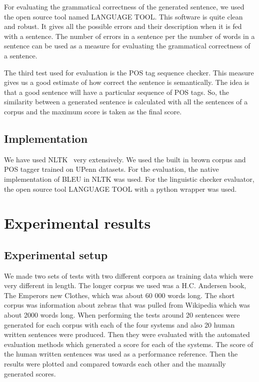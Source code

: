 \documentclass[a4paper,12pt]{article}
\begin{document}
For evaluating the grammatical correctness of the generated sentence, we used the
open source tool named LANGUAGE TOOL. This software is quite clean and robust. It gives 
all the possible errors and their description when it is fed with a sentence. The number 
of errors in a sentence per the number of words in a sentence can be used as a measure
for evaluating the grammatical correctness of a sentence.

The third test used for evaluation is the POS tag sequence checker. This measure 
gives us a good estimate of how correct the sentence is semantically. The idea
is that a good sentence will have a particular sequence of POS tags. So, the similarity
between a generated sentence is calculated with all the sentences of a corpus and the 
maximum score is taken as the final score. 

\subsection{Implementation}
\label{sec:impl}

We have used NLTK~\cite{nltk} very extensively. We used the built in brown
corpus and POS tagger trained on UPenn datasets. 
For the evaluation, the native implementation of BLEU in NLTK was used. 
For the linguistic checker evaluator, the open source tool LANGUAGE TOOL with a python
wrapper was used.

\section{Experimental results}
\label{sec:exps}

\subsection{Experimental setup}

We made two sets of tests with two different corpora as training data which were
very different in length.
The longer corpus we used was a H.C. Andersen book, The Emperors new Clothes,
which was about 60 000 words long.
The short corpus was information about zebras that was pulled from Wikipedia
which was about 2000 words long.
When performing the tests around 20 sentences were generated for each corpus with each of the four systems and also 20 human written sentences were produced. 
Then they were evaluated with the automated evaluation methods which generated a score for each of the systems.
The score of the human written sentences was used as a performance reference. Then the results were plotted and compared
towards each other and the manually generated scores.
\end{document}
